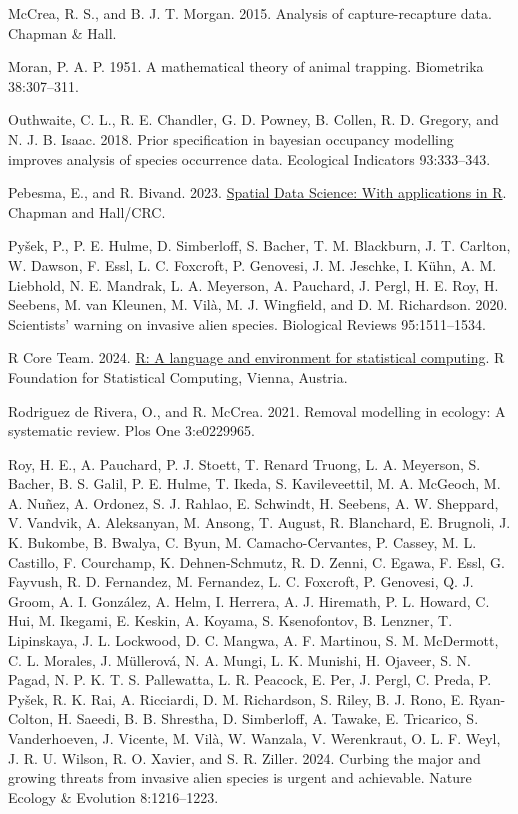 \documentclass[
  11pt,
  a4paper,
]{article}
\newlength{\cslhangindent}
\newenvironment{CSLReferences}[2] %
 {\begin{list}{}{%
  \setlength{\itemindent}{0pt}
  \setlength{\leftmargin}{0pt}
  \setlength{\parsep}{0pt}
  \ifodd #1
   \setlength{\leftmargin}{\cslhangindent}
   \setlength{\itemindent}{-1\cslhangindent}
  \fi
  \setlength{\itemsep}{#2\baselineskip}}}
 {\end{list}}
\begin{document}
\begin{CSLReferences}{1}{0}
McCrea, R. S., and B. J. T. Morgan. 2015. Analysis of capture-recapture data. Chapman \& Hall.

Moran, P. A. P. 1951. A mathematical theory of animal trapping. Biometrika 38:307--311.

Outhwaite, C. L., R. E. Chandler, G. D. Powney, B. Collen, R. D. Gregory, and N. J. B. Isaac. 2018. Prior specification in bayesian occupancy modelling improves analysis of species occurrence data. Ecological Indicators 93:333--343.

Pebesma, E., and R. Bivand. 2023. \href{https://doi.org/10.1201/9780429459016}{{Spatial Data Science: With applications in R}}. {Chapman and Hall/CRC}.

Pyšek, P., P. E. Hulme, D. Simberloff, S. Bacher, T. M. Blackburn, J. T. Carlton, W. Dawson, F. Essl, L. C. Foxcroft, P. Genovesi, J. M. Jeschke, I. Kühn, A. M. Liebhold, N. E. Mandrak, L. A. Meyerson, A. Pauchard, J. Pergl, H. E. Roy, H. Seebens, M. van Kleunen, M. Vilà, M. J. Wingfield, and D. M. Richardson. 2020. Scientists' warning on invasive alien species. Biological Reviews 95:1511--1534.

R Core Team. 2024. \href{https://www.R-project.org/}{R: A language and environment for statistical computing}. R Foundation for Statistical Computing, Vienna, Austria.

Rodriguez de Rivera, O., and R. McCrea. 2021. Removal modelling in ecology: A systematic review. Plos One 3:e0229965.

Roy, H. E., A. Pauchard, P. J. Stoett, T. Renard Truong, L. A. Meyerson, S. Bacher, B. S. Galil, P. E. Hulme, T. Ikeda, S. Kavileveettil, M. A. McGeoch, M. A. Nuñez, A. Ordonez, S. J. Rahlao, E. Schwindt, H. Seebens, A. W. Sheppard, V. Vandvik, A. Aleksanyan, M. Ansong, T. August, R. Blanchard, E. Brugnoli, J. K. Bukombe, B. Bwalya, C. Byun, M. Camacho-Cervantes, P. Cassey, M. L. Castillo, F. Courchamp, K. Dehnen-Schmutz, R. D. Zenni, C. Egawa, F. Essl, G. Fayvush, R. D. Fernandez, M. Fernandez, L. C. Foxcroft, P. Genovesi, Q. J. Groom, A. I. González, A. Helm, I. Herrera, A. J. Hiremath, P. L. Howard, C. Hui, M. Ikegami, E. Keskin, A. Koyama, S. Ksenofontov, B. Lenzner, T. Lipinskaya, J. L. Lockwood, D. C. Mangwa, A. F. Martinou, S. M. McDermott, C. L. Morales, J. Müllerová, N. A. Mungi, L. K. Munishi, H. Ojaveer, S. N. Pagad, N. P. K. T. S. Pallewatta, L. R. Peacock, E. Per, J. Pergl, C. Preda, P. Pyšek, R. K. Rai, A. Ricciardi, D. M. Richardson, S. Riley, B. J. Rono, E. Ryan-Colton, H. Saeedi, B. B. Shrestha, D. Simberloff, A. Tawake, E. Tricarico, S. Vanderhoeven, J. Vicente, M. Vilà, W. Wanzala, V. Werenkraut, O. L. F. Weyl, J. R. U. Wilson, R. O. Xavier, and S. R. Ziller. 2024. Curbing the major and growing threats from invasive alien species is urgent and achievable. Nature Ecology \& Evolution 8:1216--1223.


\end{CSLReferences}
\end{document}
